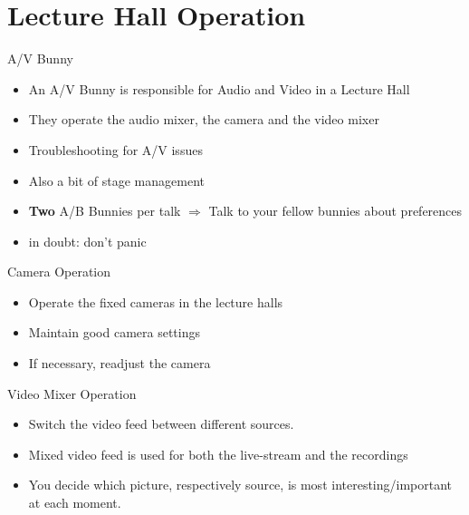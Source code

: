 \documentclass[aspectratio=169]{beamer}
\begin{document}
\section{Lecture Hall Operation}
\begin{frame}{A/V Bunny}
	\begin{itemize}
		\item An A/V Bunny is responsible for Audio and Video in a Lecture Hall
		\item They operate the audio mixer, the camera and the video mixer
		\item Troubleshooting for A/V issues
		\item Also a bit of stage management
		\item \textbf{Two} A/B Bunnies per talk $\Rightarrow$  Talk to your fellow bunnies about preferences
		\item in doubt: don't panic
	\end{itemize}
\end{frame}


\begin{frame}{Camera Operation}
	\begin{itemize}
		\item Operate the fixed cameras in the lecture halls
		\item Maintain good camera settings
		\item If necessary, readjust the camera
	\end{itemize}
\end{frame}

\begin{frame}{Video Mixer Operation}
	\begin{itemize}
		\item Switch the video feed between different sources. 
		\item Mixed video feed is used for both the live-stream and the recordings 
		\item You decide which picture, respectively source, is most interesting/important at each moment.
	\end{itemize}
\end{frame}
\end{document}
